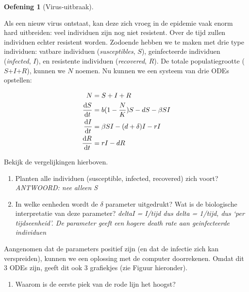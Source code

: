 \documentclass[
  a4paper,
]{scrbook}
\providecommand{\tightlist}{%
  \setlength{\itemsep}{0pt}\setlength{\parskip}{0pt}}\usepackage{longtable,booktabs,array}
\theoremstyle{definition}
\newtheorem{exercise}{Oefening}[chapter]
\theoremstyle{remark}
\begin{document}
\begin{exercise}[Virus-uitbraak]\protect\hypertarget{exr-virusuitbraak}{}\label{exr-virusuitbraak}

Als een nieuw virus ontstaat, kan deze zich vroeg in de epidemie vaak
enorm hard uitbreiden: veel individuen zijn nog niet resistent. Over de
tijd zullen individuen echter resistent worden. Zodoende hebben we te
maken met drie type individuen: vatbare individuen (\emph{susceptibles},
\(S\)), geinfecteerde individuen (\emph{infected}, \(I\)), en resistente
individuen (\emph{recovered}, \(R\)). De totale populatiegrootte
(\(S\)+\(I\)+\(R\)), kunnen we \(N\) noemen. Nu kunnen we een systeem
van drie ODEs opstellen:

\begin{align}
N &= S+I+R\\
\mathchoice{\frac{\mathrm{d}S}
{\mathrm{d}t}}{\mathrm{d}S/\mathrm{d}t}
{\mathrm{d}S/\mathrm{d}t}
{\mathrm{d}S/\mathrm{d}t} &= b(1-\frac{N}{K})S - dS - \beta S I \\
\mathchoice{\frac{\mathrm{d}I}
{\mathrm{d}t}}{\mathrm{d}I/\mathrm{d}t}
{\mathrm{d}I/\mathrm{d}t}
{\mathrm{d}I/\mathrm{d}t} &= \beta SI - (d+\delta)I - rI \\
\mathchoice{\frac{\mathrm{d}R}
{\mathrm{d}t}}{\mathrm{d}R/\mathrm{d}t}
{\mathrm{d}R/\mathrm{d}t}
{\mathrm{d}R/\mathrm{d}t} &= rI - dR
\end{align}

Bekijk de vergelijkingen hierboven.

\begin{enumerate}
\def\labelenumi{\alph{enumi}.}
\item
  Planten alle individuen (susceptible, infected, recovered) zich voort?
  \emph{ANTWOORD: nee alleen S}
\item
  In welke eenheden wordt de \(\delta\) parameter uitgedrukt? Wat is de
  biologische interpretatie van deze parameter? \emph{deltaI = I/tijd
  dus delta = 1/tijd, dus `per tijdseenheid'. De parameter geeft een
  hogere death rate aan geinfecteerde individuen}
\end{enumerate}

Aangenomen dat de parameters positief zijn (en dat de infectie zich kan
verspreiden), kunnen we een oplossing met de computer doorrekenen. Omdat
dit 3 ODEs zijn, geeft dit ook 3 grafiekjes (zie Figuur hieronder).

\begin{enumerate}
\def\labelenumi{\alph{enumi}.}
\setcounter{enumi}{2}
\tightlist
\item
  Waarom is de eerste piek van de rode lijn het hoogst?
\end{enumerate}


\end{exercise}
\end{document}
